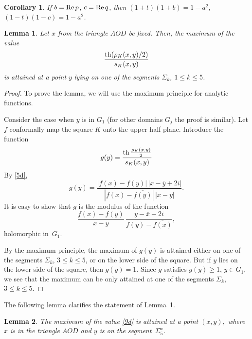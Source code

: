 \documentclass[12pt,a4paper]{amsart}
\newtheorem{lemma}{Lemma}
\newtheorem{cor}{Corollary}
\def\Re{\mathop{\rm Re}\nolimits}
\def\th{\mathop{\rm th}\nolimits}
\begin{document}
\begin{cor}\label{cr1}
If $b=\Re p$, $c=\Re q$, then $(1+t)(1+b)=1-a^2$, $(1-t)(1-c)=1-a^2$.
\end{cor}

\begin{lemma}\label{t3} Let $x$ from the triangle $AOD$ be fixed. Then,
the maximum of the value
\begin{equation}\label{9d}
\displaystyle\frac{\th ({\rho_K(x,y)}/{2})}{s_K(x,y)}
\end{equation}
is attained at a point  $y$ lying on one of the segments $\Sigma_k$,
$1\le k\le 5$.
    \end{lemma}
    \begin{proof} To prove the lemma, we will use the maximum principle for analytic functions.

Consider the case when $y$ is in $G_1$ (for other domains $G_j$ the
proof is similar). Let $f$ conformally map the square $K$ onto the
upper half-plane. Introduce the function
$$
g(y) = \displaystyle\frac{\th \frac{\rho_K(x,y)}{2}}{s_K(x,y)}
$$
By \eqref{5d},
$$
g(y) = \frac{|f(x)-f(y)|\,|x-\overline{y}+2i|}{|f(x)-\overline{f(y)}|\,|x-y|}.
$$
It is easy to show that $g$ is the modulus of the function
$$
\frac{f(x)-f(y)}{x-y}\,\frac{y-\overline{x}-2i}{f(y)-\overline{f(x)}},
$$
holomorphic in~$G_1$.

By the maximum principle, the maximum of $g(y)$ is attained either
on one of the segments $\Sigma_k$, $3\le k\le 5$, or on the lower
side of the square. But if $y$ lies on the  lower side of the
square, then $g(y)=1$. Since   $g$ satisfies $g(y)\ge 1$, $y\in
G_1$, we see that the maximum can be only attained at one of the
segments $\Sigma_k$, $3\le k\le 5$.
 \end{proof}

The following lemma clarifies the statement of Lemma~\ref{t3}.

    \begin{lemma}\label{t4} The maximum of the value \eqref{9d}
is attained at a point $(x,y),$ where $x$  is in the triangle $AOD$ and $y$ is on the segment~$\Sigma_5^x$.
    \end{lemma}
\end{document}
